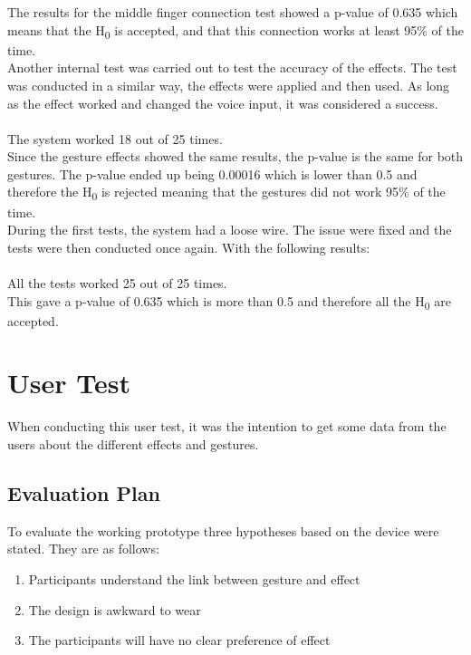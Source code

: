 The results for the middle finger connection test showed a p-value of 0.635 which means that the H\textsubscript{0} is accepted, and that this connection works at least 95\% of the time. \\

Another internal test was carried out to test the accuracy of the effects. The test was conducted in a similar way, the effects were applied and then used. 
As long as the effect worked and changed the voice input, it was considered a success. \\\\
The system worked 18 out of 25 times. \\

Since the gesture effects showed the same results, the p-value is the same for both gestures. 
The p-value ended up being 0.00016 which is lower than 0.5 and therefore the H\textsubscript{0} is rejected meaning that the gestures did not work 95\% of the time. \\

During the first tests, the system had a loose wire. The issue were fixed and the tests were then conducted once again. With the following results:\\\\
All the tests worked 25 out of 25 times. \\

This gave a p-value of 0.635 which is more than 0.5 and therefore all the H\textsubscript{0} are accepted.  

\section{User Test}
When conducting this user test, it was the intention to get some data from the users about the different effects and gestures. 

\subsection{Evaluation Plan}
To evaluate the working prototype three hypotheses based on the device were stated. They are as follows:

\begin{enumerate}
\item Participants understand the link between gesture and effect
\item The design is awkward to wear
\item The participants will have no clear preference of effect
\end{enumerate} 

